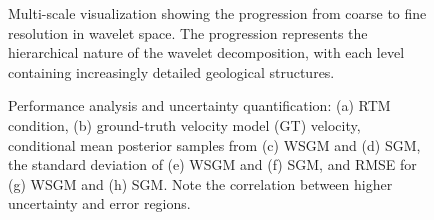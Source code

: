 \documentclass[
]{article}
\begin{document}
\begin{figure}
\begin{minipage}{\linewidth}
\end{minipage}%
\newline
\begin{minipage}{\linewidth}

\end{minipage}%

\caption{\label{fig-multiscale}Multi-scale visualization showing the
progression from coarse to fine resolution in wavelet space. The
progression represents the hierarchical nature of the wavelet
decomposition, with each level containing increasingly detailed
geological structures.}

\end{figure}%

\begin{figure}


\caption{\label{fig-performance}Performance analysis and uncertainty
quantification: (a) RTM condition, (b) ground-truth velocity model (GT)
velocity, conditional mean posterior samples from (c) WSGM and (d) SGM,
the standard deviation of (e) WSGM and (f) SGM, and RMSE for (g) WSGM
and (h) SGM. Note the correlation between higher uncertainty and error
regions.}

\end{figure}%
\end{document}
